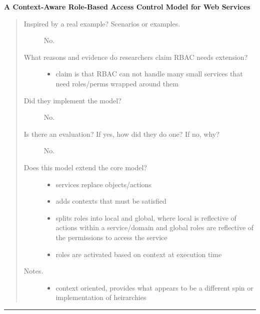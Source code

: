 \documentclass[letterpaper,10pt,english]{sphinxmanual}
\begin{document}
\textbf{A Context-Aware Role-Based Access Control Model for Web Services}
\begin{quote}
\begin{description}
\item[{Inspired by a real example? Scenarios or examples.}] \leavevmode
No.

\item[{What reasons and evidence do researchers claim RBAC needs extension?}] \leavevmode\begin{itemize}
\item {} 
claim is that RBAC can not handle many small services that need roles/perms wrapped around them

\end{itemize}

\item[{Did they implement the model?}] \leavevmode
No.

\item[{Is there an evaluation? If yes, how did they do one? If no, why?}] \leavevmode
No.

\item[{Does this model extend the core model?}] \leavevmode\begin{itemize}
\item {} 
services replace objects/actions

\item {} 
adds contexts that must be satisfied

\item {} 
splits roles into local and global, where local is reflective of actions within a service/domain and global roles are reflective of the permissions to access the service

\item {} 
roles are activated based on context at execution time

\end{itemize}

\item[{Notes.}] \leavevmode\begin{itemize}
\item {} 
context oriented, provides what appears to be a different spin or implementation of heirarchies

\end{itemize}

\end{description}
\end{quote}


\bigskip\hrule{}\bigskip
\end{document}
